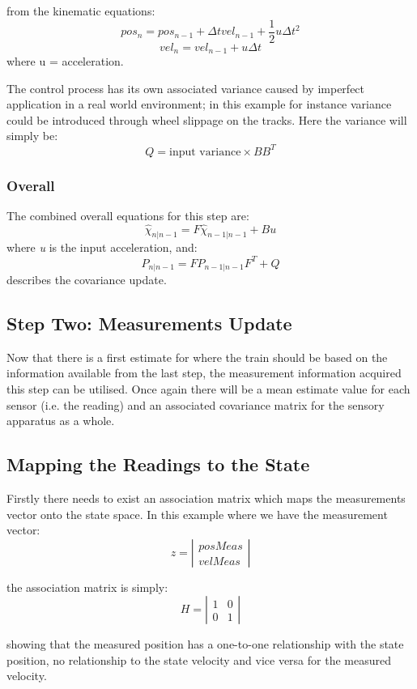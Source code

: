 \documentclass[12pt]{article}
\begin{document}
from the kinematic equations:
\[pos_n = pos_{n-1} + \Delta t vel_{n-1} + \frac{1}{2} u \Delta t^2\]
\[vel_n = vel_{n-1} + u \Delta t\]
where u = acceleration.

The control process has its own associated variance caused by imperfect application in a real world environment; in this example for instance variance could be introduced through wheel slippage on the tracks. Here the variance will simply be:
\[Q 
=
\textrm{input variance}
\times
BB^T\]

\subsubsection{Overall}
The combined overall equations for this step are:
\[\hat{\chi}_{n|n-1} = F\hat{\chi}_{n-1|n-1} + Bu\]
where \textit{u} is the input acceleration, and:
\[P_{n|n-1} = FP_{n-1|n-1}F^T + Q\]
describes the covariance update.

\subsection{Step Two: Measurements Update}
Now that there is a first estimate for where the train should be based on the information available from the last step, the measurement information acquired this step can be utilised. Once again there will be a mean estimate value for each sensor (i.e. the reading) and an associated covariance matrix for the sensory apparatus as a whole. \par
\subsection{Mapping the Readings to the State}
	Firstly there needs to exist an association matrix which maps the measurements vector onto the state space. In this example where we have the measurement vector:
\[z 
=
\left |  \begin{array}{c}
posMeas \\
velMeas
\end{array}  \right |\]

the association matrix is simply:
\[H 
=
\left |  \begin{array}{cc}
1 & 0 \\
0 & 1
\end{array}  \right |\]

showing that the measured position has a one-to-one relationship with the state position, no relationship to the state velocity and vice versa for the measured velocity.\par
\end{document}
